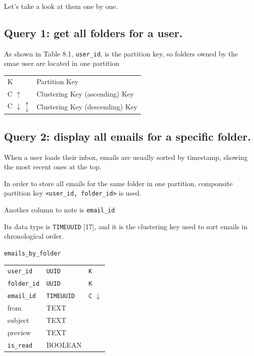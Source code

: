 \documentclass{report}
\theoremstyle{definition}
\let\oldsubsection\subsection
\renewcommand{\subsection}{\oldsubsection*}
\begin{document}
Let's take a look at them one by one.

\subsection{Query 1: get all folders for a user.}

As shown in Table 8.1, \lstinline|user_id|, is the partition key, so folders owned by the smae user are located in one partition

\begin{tabular}{|p{6cm}|p{6cm}|}
\hline
K & Partition Key \\
C $\uparrow$ & Clustering Key (ascending) Key \\
C $\downarrow$ $\mathbf{\genfrac{}{}{0pt}{}{\uparrow}{\downarrow}}$ & Clustering Key (descending) Key \\
\hline
\end{tabular}

\subsection{Query 2: display all emails for a specific folder.}

When a user loads their inbox, emails are usually sorted by timestamp, showing the most recent ones at the top.

In order to store all emails for the same folder in one partition, componsite partition key \lstinline|<user_id, folder_id>| is used.

Another column to note is \lstinline|email_id|

Its data type is \lstinline|TIMEUUID| [17], and it is the clustering key used to sort emails in chronological order.

\lstinline|emails_by_folder|

\begin{tabular}{|p{4cm}|p{4cm}|p{4cm}|}
\hline
\lstinline|user_id| & \lstinline|UUID| & \lstinline|K| \\
\lstinline|folder_id| & \lstinline|UUID| & \lstinline|K| \\
\lstinline|email_id| & \lstinline|TIMEUUID| & \lstinline|C| $\downarrow$ \\
from & TEXT &  \\
subject & TEXT &  \\
preview & TEXT &  \\
\lstinline|is_read| & BOOLEAN &  \\
\hline
\end{tabular}
\end{document}
